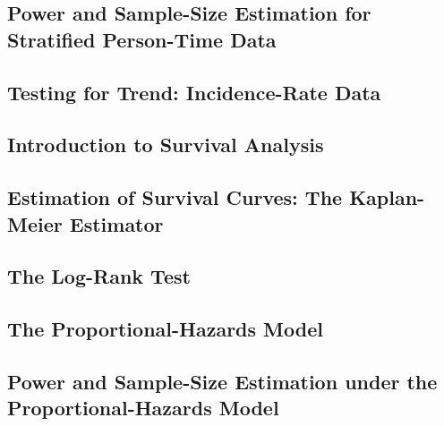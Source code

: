 \documentclass[12pt,]{article}
\begin{document}
\hypertarget{power-and-sample-size-estimation-for-stratified-person-time-data}{%
\subsection{Power and Sample-Size Estimation for Stratified Person-Time
Data}\label{power-and-sample-size-estimation-for-stratified-person-time-data}}

\hypertarget{testing-for-trend-incidence-rate-data}{%
\subsection{Testing for Trend: Incidence-Rate
Data}\label{testing-for-trend-incidence-rate-data}}

\hypertarget{introduction-to-survival-analysis}{%
\subsection{Introduction to Survival
Analysis}\label{introduction-to-survival-analysis}}

\hypertarget{estimation-of-survival-curves-the-kaplan-meier-estimator}{%
\subsection{Estimation of Survival Curves: The Kaplan-Meier
Estimator}\label{estimation-of-survival-curves-the-kaplan-meier-estimator}}

\hypertarget{the-log-rank-test}{%
\subsection{The Log-Rank Test}\label{the-log-rank-test}}

\hypertarget{the-proportional-hazards-model}{%
\subsection{The Proportional-Hazards
Model}\label{the-proportional-hazards-model}}

\hypertarget{power-and-sample-size-estimation-under-the-proportional-hazards-model}{%
\subsection{Power and Sample-Size Estimation under the
Proportional-Hazards
Model}\label{power-and-sample-size-estimation-under-the-proportional-hazards-model}}
\end{document}
